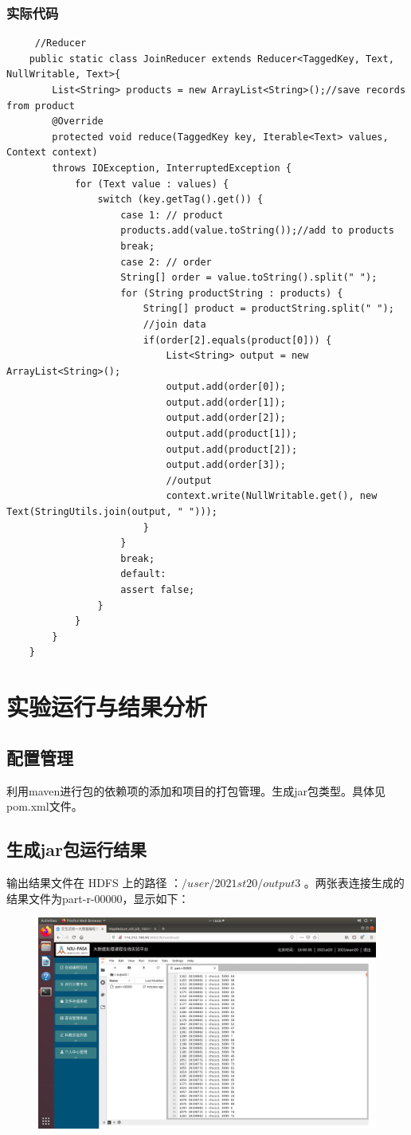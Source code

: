 \documentclass{article}
\begin{document}
\subsubsection{实际代码}

\begin{lstlisting}
	 //Reducer
	public static class JoinReducer extends Reducer<TaggedKey, Text, NullWritable, Text>{
		List<String> products = new ArrayList<String>();//save records from product
		@Override
		protected void reduce(TaggedKey key, Iterable<Text> values, Context context)
		throws IOException, InterruptedException {
			for (Text value : values) {
				switch (key.getTag().get()) {
					case 1: // product
					products.add(value.toString());//add to products
					break;
					case 2: // order
					String[] order = value.toString().split(" ");
					for (String productString : products) {
						String[] product = productString.split(" ");
						//join data
						if(order[2].equals(product[0])) {
							List<String> output = new ArrayList<String>();
							output.add(order[0]);
							output.add(order[1]);
							output.add(order[2]);
							output.add(product[1]);
							output.add(product[2]);
							output.add(order[3]);
							//output
							context.write(NullWritable.get(), new Text(StringUtils.join(output, " ")));
						}
					}
					break;
					default:
					assert false;
				}
			}
		}
	}
\end{lstlisting}


\section{实验运行与结果分析}

\subsection{配置管理}
利用maven进行包的依赖项的添加和项目的打包管理。生成jar包类型。具体见pom.xml文件。

\subsection{生成jar包运行结果}
输出结果文件在 HDFS 上的路径 ：$/user/2021st20/output3$ 。两张表连接生成的结果文件为part-r-00000，显示如下：
\begin{figure}[H]
	\centering
	\includegraphics[scale=0.2]{output.png}
\end{figure}
\end{document}
